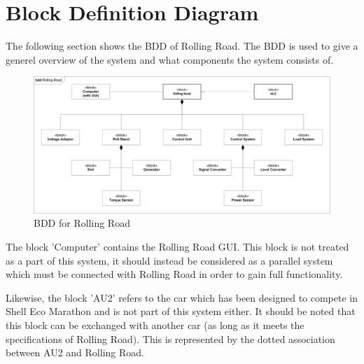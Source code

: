 \section{Block Definition Diagram}
The following section shows the BDD of Rolling Road. The BDD is used to give a generel overview of the system and what components the system consists of. 

\begin{figure}[H]
	\centering
	\includegraphics[width=1\linewidth]{Architecture/Diagrams/BDD_RR}
	\caption{BDD for Rolling Road}
	\label{fig:RR_BDD}
\end{figure}

The block 'Computer' contains the Rolling Road GUI. This block is not treated as a part of this system, it should instead be considered as a parallel system which must be connected with Rolling Road in order to gain full functionality.

Likewise, the block 'AU2' refers to the car which has been designed to compete in Shell Eco Marathon and is not part of this system either. It should be noted that this block can be exchanged with another car (as long as it meets the specifications of Rolling Road). This is represented by the dotted association between AU2 and Rolling Road.